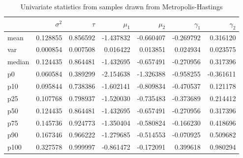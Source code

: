 \documentclass{article}
\begin{document}
\begin{table}[H]
  \begin{center}
    \begin{tabular}{lrrrrrr}
      {} &$\sigma^2$ & $\tau$ & $\mu_1$ & $\mu_2$ & $\gamma_1$ & $\gamma_2$ \\
      \midrule
      mean   &  0.128855 &  0.856592 & -1.437832 & -0.660407 & -0.269792 &  0.316120 \\
      var    &  0.000854 &  0.007508 &  0.016422 &  0.013851 &  0.024934 &  0.023575 \\
      median &  0.124435 &  0.864481 & -1.432695 & -0.657491 & -0.270956 &  0.317396 \\
      p0     &  0.060584 &  0.389299 & -2.154638 & -1.326388 & -0.958255 & -0.361611 \\
      p10    &  0.095844 &  0.738386 & -1.602141 & -0.809834 & -0.470537 &  0.121178 \\
      p25    &  0.107768 &  0.798937 & -1.520030 & -0.735483 & -0.373689 &  0.214412 \\
      p50    &  0.124435 &  0.864481 & -1.432695 & -0.657491 & -0.270956 &  0.317396 \\
      p75    &  0.145736 &  0.924773 & -1.350404 & -0.580824 & -0.166230 &  0.418696 \\
      p90    &  0.167346 &  0.966222 & -1.279685 & -0.514553 & -0.070925 &  0.509682 \\
      p100   &  0.327578 &  0.999997 & -0.861472 & -0.172091 &  0.399618 &  0.980294 \\
      \bottomrule
      \end{tabular}
  \end{center}
  \caption{\label{tab:mh_univar} Univariate statistics from samples drawn from Metropolis-Hastings}
\end{table}
\end{document}
